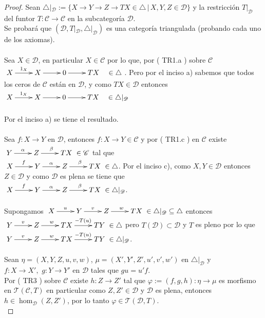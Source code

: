 \documentclass{article}
\begin{document}
\begin{enumerate}
\begin{proof}
 Sean $\triangle|_{\mathscr{D}}:=\{X\to Y\to Z\to TX\in \triangle\,|\, X,Y,Z\in \mathscr{D}\}$ y la restricción $T|_{\mathscr{D}}$ del
funtor $T:\mathscr{C}\longrightarrow \mathscr{C}$ en la subcategoría $\mathscr{D}$.\\

Se probará que $(\mathscr{D},T|_{\mathscr{D}},\triangle|_{\mathscr{D}})$ es una categoría triangulada (probando cada uno de los axiomas).\\

\\
Sea $X\in \mathscr{D}$, en particular  $X\in \mathscr{C}$ por lo que, por ( TR1.a ) sobre $\mathscr{C}$
\\$\xymatrix{X\ar[r]^{1_X}&X\ar[r]&0\ar[r]&TX\quad\in \triangle}$.
Pero por el inciso a) sabemos que todos los ceros de $\mathscr{C}$ están en $\mathscr{D}$, y como $TX\in \mathscr{D}$  entonces \\
$\xymatrix{X\ar[r]^{1_X}&X\ar[r]&0\ar[r]&TX\quad\in \triangle|_{\mathscr{D}}}$\\

\\
Por el inciso a) se tiene el resultado.\\

\\
Sea $f:X\to Y$ en $\mathscr{D}$, entonces $f:X\to Y\in \mathscr{C}$ y por ( TR1.c ) en $\mathscr{C}$ existe
$\xymatrix{Y\ar[r]^{\alpha}&Z\ar[r]^{\beta}&TX}\in \mathscr{C}$ tal que \\
$\xymatrix{X\ar[r]^{f}&Y\ar[r]^{\alpha}&Z\ar[r]^{\beta}&TX}\in \triangle$. Por el inciso c), como $X,Y\in \mathscr{D}$ entonces $Z\in \mathscr{D}$
y como $\mathscr{D}$ es plena se tiene que \\$\xymatrix{X\ar[r]^{f}&Y\ar[r]^{\alpha}&Z\ar[r]^{\beta}&TX}\in \triangle|_{\mathscr{D}}$.\\

\\
Supongamos $\xymatrix{X\ar[r]^{u}&Y\ar[r]^{v}&Z\ar[r]^{w}&TX}\in \triangle|_{\mathscr{D}}\subseteq \triangle$ entonces \\
$\xymatrix{Y\ar[r]^{v}&Z\ar[r]^{w}&TX\ar[r]^{-T(u)}&TY}\in \triangle$ pero $T(\mathscr{D})\subset \mathscr{D}$ y $T$ es pleno por lo que 
$\xymatrix{Y\ar[r]^{v}&Z\ar[r]^{w}&TX\ar[r]^{-T(u)}&TY}\in \triangle|_{\mathscr{D}}$.\\

\\
Sean $\eta=(X,Y,Z,u,v,w)$, $\mu=(X',Y',Z',u',v',w')$ en $\triangle|_{\mathscr{D}}$ y\\$f:X\to X',\,\, g:Y\to Y'$ en $\mathscr{D}$ tales que $gu=u'f$.\\
Por ( TR3 ) sobre $\mathscr{C}$ existe $h:Z\to Z'$ tal que $\varphi:=(f,g,h):\eta\to \mu$ es morfismo en $\mathscr{T}(\mathscr{C},T)$ en particular
como $Z,Z'\in \mathscr{D}$ y $\mathscr{D}$ es plena, entonces $h\in \hom_{\mathscr{D}}(Z,Z')$, por lo tanto $\varphi\in \mathscr{T}(\mathscr{D},T)$.
\\


\end{proof}
\end{enumerate}
\end{document}
